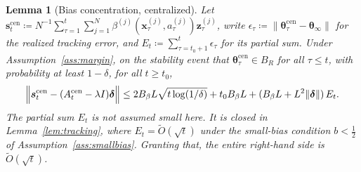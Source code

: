 \documentclass[11pt]{article}
\newtheorem{lemma}[theorem]{Lemma}
\begin{document}
\begin{lemma}[Bias concentration, centralized]\label{lem:bias}
Let $\bm{s}_t^{\mathrm{cen}}\coloneqq
N^{-1}\sum_{\tau=1}^t\sum_{j=1}^N
\beta^{(j)}(\bm{x}_\tau^{(j)},a_\tau^{(j)})\bm{z}_\tau^{(j)}$, write
$\epsilon_\tau\coloneqq\|\bm{\theta}_\tau^{\mathrm{cen}}-\bm{\theta}_\infty\|$
for the realized tracking error, and
$E_t\coloneqq\sum_{\tau=t_0+1}^t\epsilon_\tau$ for its partial sum.
Under Assumption~\ref{ass:margin}, on the stability event that
$\bm{\theta}_\tau^{\mathrm{cen}}\in B_R$ for all $\tau\leq t$, with
probability at least $1-\delta$, for all $t\geq t_0$,
\[
\Bigl\|\bm{s}_t^{\mathrm{cen}}-(A_t^{\mathrm{cen}}-\lambda I)\bm{\delta}\Bigr\|
\leq 2B_\beta L\sqrt{t\log(1/\delta)}+t_0 B_\beta L
+(B_\beta L+L^2\|\bm{\delta}\|)\,E_t.
\]
The partial sum $E_t$ is \emph{not} assumed small here. It is closed in
Lemma~\ref{lem:tracking}, where $E_t=\widetilde O(\sqrt t)$ under the
small-bias condition $b<\tfrac12$ of Assumption~\ref{ass:smallbias}.
Granting that, the entire right-hand side is $\widetilde O(\sqrt t)$.
\end{lemma}
\end{document}
